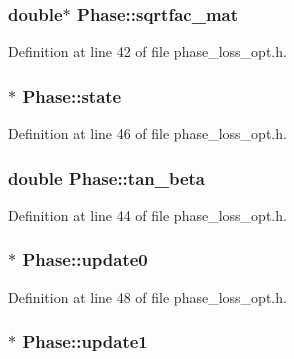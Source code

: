 \subsubsection[{sqrtfac\+\_\+mat}]{\setlength{\rightskip}{0pt plus 5cm}double$\ast$ Phase\+::sqrtfac\+\_\+mat}\label{class_phase_a64295bfa90607498ff8c544122afc3f9}


Definition at line 42 of file phase\+\_\+loss\+\_\+opt.\+h.

\hypertarget{class_phase_ab563c75af841b7c481f805d8a026518e}{}
\subsubsection[{state}]{$\ast$ Phase\+::state}\label{class_phase_ab563c75af841b7c481f805d8a026518e}


Definition at line 46 of file phase\+\_\+loss\+\_\+opt.\+h.

\hypertarget{class_phase_a5ed12bc03ed5641e7d6486aefbc33ee3}{}
\subsubsection[{tan\+\_\+beta}]{\setlength{\rightskip}{0pt plus 5cm}double Phase\+::tan\+\_\+beta}\label{class_phase_a5ed12bc03ed5641e7d6486aefbc33ee3}


Definition at line 44 of file phase\+\_\+loss\+\_\+opt.\+h.

\hypertarget{class_phase_a29c2f7fd9df0afc222d810d037ea9ded}{}
\subsubsection[{update0}]{$\ast$ Phase\+::update0}\label{class_phase_a29c2f7fd9df0afc222d810d037ea9ded}


Definition at line 48 of file phase\+\_\+loss\+\_\+opt.\+h.

\hypertarget{class_phase_aef5f586464d8609c933b2c28afc1fbf1}{}
\subsubsection[{update1}]{$\ast$ Phase\+::update1}\label{class_phase_aef5f586464d8609c933b2c28afc1fbf1}


